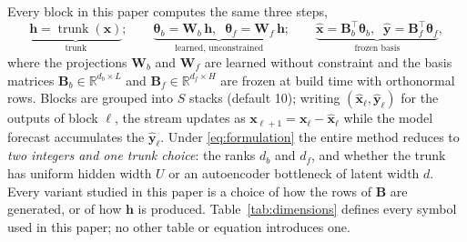 Every block in this paper computes the same three steps,
\begin{equation}
\label{eq:formulation}
\underbrace{\mathbf{h} = \operatorname{trunk}(\mathbf{x})}_{\text{trunk}};\qquad
\underbrace{\boldsymbol{\theta}_b = \mathbf{W}_b\,\mathbf{h},\;\;
\boldsymbol{\theta}_f = \mathbf{W}_f\,\mathbf{h}}_{\text{learned, unconstrained}};\qquad
\underbrace{\hat{\mathbf{x}} = \mathbf{B}_b^{\top}\boldsymbol{\theta}_b,\;\;
\hat{\mathbf{y}} = \mathbf{B}_f^{\top}\boldsymbol{\theta}_f}_{\text{frozen basis}},
\end{equation}
where the projections $\mathbf{W}_b$ and $\mathbf{W}_f$ are learned without
constraint and the basis matrices $\mathbf{B}_b \in \mathbb{R}^{d_b \times L}$
and $\mathbf{B}_f \in \mathbb{R}^{d_f \times H}$ are frozen at build time with
orthonormal rows. Blocks are grouped into $S$ stacks (default 10); writing
$(\hat{\mathbf{x}}_\ell, \hat{\mathbf{y}}_\ell)$ for the outputs of block
$\ell$, the stream updates as $\mathbf{x}_{\ell+1} = \mathbf{x}_\ell -
\hat{\mathbf{x}}_\ell$ while the model forecast accumulates the
$\hat{\mathbf{y}}_\ell$. Under \eqref{eq:formulation} the entire method
reduces to \emph{two integers and one trunk choice}: the ranks $d_b$ and
$d_f$, and whether the trunk has uniform hidden width $U$ or an autoencoder
bottleneck of latent width $d$. Every variant studied in this paper is a
choice of how the rows of $\mathbf{B}$ are generated, or of how $\mathbf{h}$
is produced. Table~\ref{tab:dimensions} defines every symbol used in this
paper; no other table or equation introduces one.

